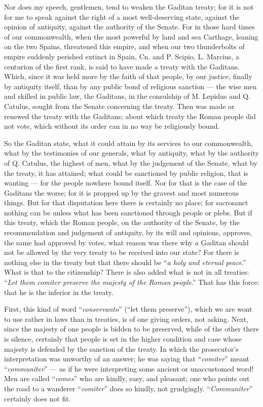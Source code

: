  Nor does my speech, gentlemen, tend to weaken the Gaditan treaty; for it is not for me to speak against the right of a most well-deserving state, against the opinion of antiquity, against the authority of the Senate. For in those hard times of our commonwealth, when the most powerful by land and sea Carthage, leaning on the two Spains, threatened this empire, and when our two thunderbolts of empire suddenly perished extinct in Spain, Cn. and P. Scipio, L. Marcius, a centurion of the first rank, is said to have made a treaty with the Gaditans. Which, since it was held more by the faith of that people, by our justice, finally by antiquity itself, than by any public bond of religious sanction --- the wise men and skilled in public law, the Gaditans, in the consulship of M. Lepidus and Q. Catulus, sought from the Senate concerning the treaty. Then was made or renewed the treaty with the Gaditans; about which treaty the Roman people did not vote, which without its order can in no way be religiously bound.

 So the Gaditan state, what it could attain by its services to our commonwealth, what by the testimonies of our generals, what by antiquity, what by the authority of Q. Catulus, the highest of men, what by the judgement of the Senate, what by the treaty, it has attained; what could be sanctioned by public religion, that is wanting --- for the people nowhere bound itself. Nor for that is the case of the Gaditans the worse; for it is propped up by the gravest and most numerous things. But for that disputation here there is certainly no place; for sacrosanct nothing can be unless what has been sanctioned through people or plebs. But if this treaty, which the Roman people, on the authority of the Senate, by the recommendation and judgement of antiquity, by its will and opinions, approves, the same had approved by votes, what reason was there why a Gaditan should not be allowed by the very treaty to be received into our state? For there is nothing else in the treaty but that there should be ``\textit{a holy and eternal peace}.'' What is that to the citizenship? There is also added what is not in all treaties: ``\textit{Let them comiter preserve the majesty of the Roman people}.'' That has this force: that he is the inferior in the treaty.

 First, this kind of word ``\textit{conservanto}'' (``let them preserve''), which we are wont to use rather in laws than in treaties, is of one giving orders, not asking. Next, since the majesty of one people is bidden to be preserved, while of the other there is silence, certainly that people is set in the higher condition and case whose majesty is defended by the sanction of the treaty. In which the prosecutor's interpretation was unworthy of an answer; he was saying that ``\textit{comiter}'' meant ``\textit{communiter}'' --- as if he were interpreting some ancient or unaccustomed word! Men are called ``\textit{comes}'' who are kindly, easy, and pleasant; one who points out the road to a wanderer ``\textit{comiter}'' does so kindly, not grudgingly. ``\textit{Communiter}'' certainly does not fit.

